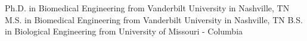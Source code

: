 %
%
%


\begin{scholarship}
					{Ph.D. in Biomedical Engineering from Vanderbilt University in Nashville, TN}
					{M.S. in Biomedical Engineering from Vanderbilt University in Nashville, TN}
					{B.S. in Biological Engineering from University of Missouri - Columbia}
\end{scholarship}